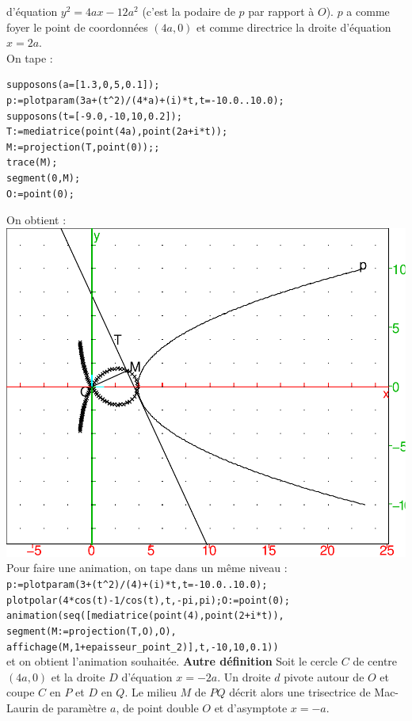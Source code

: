 \documentclass[a4paper,11pt]{book}
\begin{document}
d'\'equation $y^2=4ax-12a^2$ (c'est la podaire de $p$ par rapport \`a $O$). $p$ a comme foyer le  point de coordonn\'ees $(4a,0)$ et comme directrice la droite d'\'equation $x=2a$.\\
On tape :
\begin{verbatim}
supposons(a=[1.3,0,5,0.1]);
p:=plotparam(3a+(t^2)/(4*a)+(i)*t,t=-10.0..10.0);
supposons(t=[-9.0,-10,10,0.2]);
T:=mediatrice(point(4a),point(2a+i*t));
M:=projection(T,point(0));;
trace(M);
segment(0,M);
O:=point(0);
\end{verbatim}
On obtient :\\
\includegraphics[width=\textwidth]{trisect3}
Pour faire une animation, on tape dans un m\^eme niveau :\\
{\tt p:=plotparam(3+(t\verb|^|2)/(4)+(i)*t,t=-10.0..10.0);}\\
{\tt plotpolar(4*cos(t)-1/cos(t),t,-pi,pi);O:=point(0);}\\
{\tt animation(seq([mediatrice(point(4),point(2+i*t)),}\\
{\tt segment(M:=projection(T,O),O),}\\
{\tt affichage(M,1+epaisseur\_point\_2)],t,-10,10,0.1))}\\
et on obtient l'animation souhait\'ee.
{\bf Autre d\'efinition}
Soit le cercle $C$ de centre $(4a,0)$ et la droite $D$ d'\'equation $x=-2a$.
Un droite $d$ pivote autour de $O$ et coupe $C$ en $P$ et $D$ en $Q$. Le milieu
$M$ de $PQ$ d\'ecrit alors une trisectrice de Mac-Laurin de param\`etre $a$, 
de point double $O$ et d'asymptote $x=-a$.\\
\end{document}
